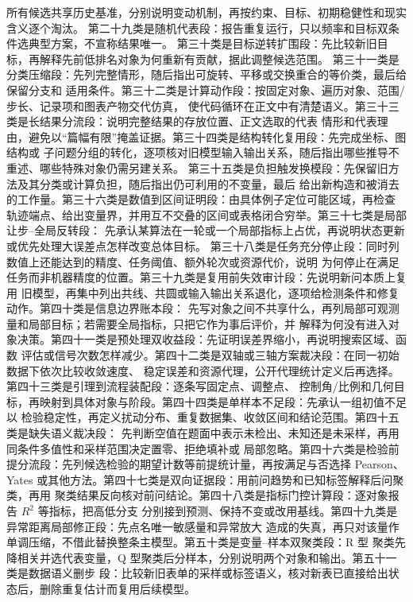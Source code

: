 所有候选共享历史基准，分别说明变动机制，再按约束、目标、初期稳健性和现实含义逐个淘汰。
第二十九类是随机代表段：报告重复运行，只以频率和目标双条件选典型方案，不宣称结果唯一。
第三十类是目标逆转扩围段：先比较新旧目标，再解释先前低排名对象为何重新有贡献，据此调整候选范围。
第三十一类是分类压缩段：先列完整情形，随后指出可旋转、平移或交换重合的等价类，最后给保留分支和
适用条件。第三十二类是计算动作段：按固定对象、遍历对象、范围/步长、记录项和图表产物交代仿真，
使代码循环在正文中有清楚语义。第三十三类是长结果分流段：说明完整结果的存放位置、正文选取的代表
情形和代表理由，避免以“篇幅有限”掩盖证据。第三十四类是结构转化复用段：先完成坐标、图结构或
子问题分组的转化，逐项核对旧模型输入输出关系，随后指出哪些推导不重述、哪些特殊对象仍需另建关系。
第三十五类是负担触发换模段：先保留旧方法及其分类或计算负担，随后指出仍可利用的不变量，最后
给出新构造和被消去的工作量。第三十六类是数值到区间证明段：由具体例子定位可能区域，再检查
轨迹端点、给出变量界，并用互不交叠的区间或表格闭合穷举。第三十七类是局部让步--全局反转段：
先承认某算法在一轮或一个局部指标上占优，再说明状态更新或优先处理大误差点怎样改变总体目标。
第三十八类是任务充分停止段：同时列数值上还能达到的精度、任务阈值、额外轮次或资源代价，说明
为何停止在满足任务而非机器精度的位置。第三十九类是复用前失效审计段：先说明新问本质上复用
旧模型，再集中列出共线、共圆或输入输出关系退化，逐项给检测条件和修复动作。第四十类是信息边界账本段：
先写对象之间不共享什么，再列局部可观测量和局部目标；若需要全局指标，只把它作为事后评价，并
解释为何没有进入对象决策。第四十一类是预处理双收益段：先证明误差界缩小，再说明搜索区域、函数
评估或信号次数怎样减少。第四十二类是双轴或三轴方案裁决段：在同一初始数据下依次比较收敛速度、
稳定误差和资源代理，公开代理统计定义后再选择。第四十三类是引理到流程装配段：逐条写固定点、调整点、
控制角/比例和几何目标，再映射到具体对象与阶段。第四十四类是单样本不足段：先承认一组初值不足以
检验稳定性，再定义扰动分布、重复数据集、收敛区间和结论范围。第四十五类是缺失语义裁决段：
先判断空值在题面中表示未检出、未知还是未采样，再用同条件多值性和采样范围决定置零、拒绝填补或
局部忽略。第四十六类是检验前提分流段：先列候选检验的期望计数等前提统计量，再按满足与否选择
Pearson、Yates 或其他方法。第四十七类是双向证据段：用前问趋势和已知标签解释后问聚类，再用
聚类结果反向核对前问结论。第四十八类是指标门控计算段：逐对象报告 $R^2$ 等指标，把高低分支
分别接到预测、保持不变或改用基线。第四十九类是异常距离局部修正段：先点名唯一敏感量和异常放大
造成的失真，再只对该量作单调压缩，不借此替换整条主模型。第五十类是变量--样本双聚类段：R 型
聚类先降相关并选代表变量，Q 型聚类后分样本，分别说明两个对象和输出。第五十一类是数据语义删步
段：比较新旧表单的采样或标签语义，核对新表已直接给出状态后，删除重复估计而复用后续模型。
